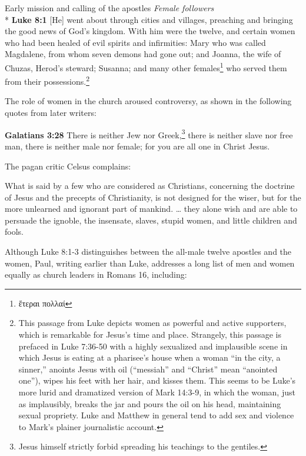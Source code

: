 \documentclass[10pt,a5paper,twoside]{article}
\newcommand{\doimage}[2]{\texttt{[image: \#2]}\label{fig:#2}}
\newcommand{\figbasic}[4]{ %
    \ifthenelse{\isodd{\pageref{fig:#2}}}{}{\hfill}
    \ifstrempty{#3}{
      \doimage{#1}{#2}
    }{
      \makebox{\doimage{#1}{#2} \\ #3}
    }
    \ifthenelse{\isodd{\pageref{fig:#2}}}{\hfill}{}
    \par
}
\newcommand{\fig}[2][0.4]{
  \figbasic{#1}{#2}{}{}
}
\newcommand{\quotesize}{\normalsize{}}
\newcommand{\comm}[1]{\begingroup \color{black!50} #1\endgroup}
\newenvironment{quotetext}{\begingroup\quotesize}{\endgroup}
\newcommand{\intex}[1]{\index[texts]{#1}}
\newcommand{\reftex}[1]{#1\intex{#1}}
\newcommand{\bible}[2]{\begin{quotetext}\textbf{#1}\intex{#1} #2\end{quotetext}}
\newcommand{\luke}[2]{\bible{Luke #1}{#2}}
\newcommand{\subhead}[1]{\emph{#1}\\*}
\begin{document}
\begin{section}{Early mission and calling of the apostles}
\subhead{Female followers}
%
\luke{8:1}{
[He] went about through cities and villages, preaching and bringing the good news of God's kingdom. With him were the twelve,   and certain women who had been healed of evil spirits and infirmities: Mary who was called Magdalene, from whom seven demons had gone out;   and Joanna, the wife of Chuzas, Herod's steward; Susanna; and many other females\footnote{ἕτεραι πολλαί} who served them from their possessions.\footnote{This passage from Luke
depicts women as powerful and active supporters, which is remarkable for Jesus's time and place. Strangely, this passage is prefaced in
\reftex{Luke 7:36-50} with a highly sexualized and implausible scene in which Jesus is eating at a pharisee's house when
a woman ``in the city, a sinner,'' anoints Jesus with oil
(``messiah'' and ``Christ'' mean ``anointed one''), wipes his feet with her hair, and kisses them.\label{luke-woman-anointing}
This seems to be Luke's
more lurid and dramatized version of \reftex{Mark 14:3-9}, in which the woman, just as implausibly, breaks the jar and pours the
oil on his head, maintaining sexual propriety.
Luke and Matthew in general tend to add sex and violence to Mark's plainer journalistic account.}
}

\fig{mary-magdalene-at-the-feet-of-jesus}

\comm{The role of women in the church aroused controversy, as shown in the following quotes from later writers:}

\bible{Galatians 3:28}{
There is neither Jew nor Greek,\footnote{Jesus himself strictly forbid spreading his teachings to the gentiles.}
there is neither slave nor free man, there is neither male nor female; for you are all one in Christ Jesus.
}

\comm{The pagan critic Celsus complains:}

\begin{quotetext}
What is said by a few who are considered as Christians, concerning the
doctrine of Jesus and the precepts of Christianity, is not designed for
the wiser, but for the more unlearned and ignorant part of mankind. \ldots
they alone wish
and are able to persuade the ignoble, the insensate, slaves, stupid
women, and little children and fools.
\end{quotetext}


\comm{Although Luke 8:1-3 distinguishes between the all-male twelve apostles and the women, Paul, writing earlier than Luke, addresses
a long list of men and women equally as church leaders in \reftex{Romans 16}, including:}


\end{section}
\end{document}
